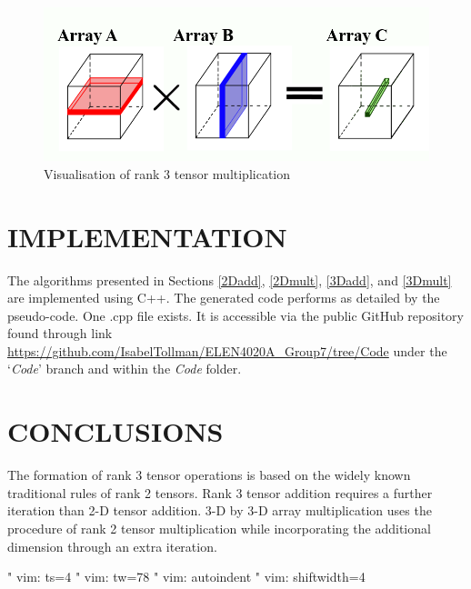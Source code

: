 \begin{figure}
	\centering
	\includegraphics[scale=0.5]{build/3Dmult.png}
	\caption{Visualisation of rank 3 tensor multiplication}
	\label{3D}
\end{figure}

\section{IMPLEMENTATION}

The algorithms presented in Sections \ref{2Dadd}, \ref{2Dmult}, \ref{3Dadd}, and \ref{3Dmult} are implemented using C++. The generated code performs as detailed by the pseudo-code. One .cpp file exists. It is accessible via the public GitHub repository found through link \url{https://github.com/IsabelTollman/ELEN4020A_Group7/tree/Code} under the `\emph{Code}' branch and within the \textit{Code} folder.

\section{CONCLUSIONS}

The formation of rank 3 tensor operations is based on the widely known traditional rules of rank 2 tensors. Rank 3 tensor addition requires a further iteration than 2-D tensor addition. 3-D by 3-D array multiplication uses the procedure of rank 2 tensor multiplication while incorporating the additional dimension through an extra iteration. 

 







" vim: ts=4
" vim: tw=78
" vim: autoindent
" vim: shiftwidth=4
